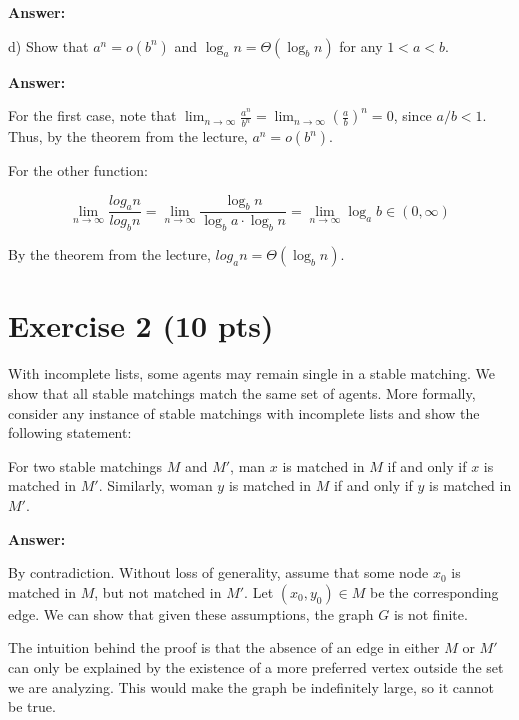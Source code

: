 \documentclass{article}
\begin{document}
\bigskip \noindent \textbf{Answer:}

\noindent d) Show that $a^n = o(b^n)$ and $\log_a n = \Theta (\log_b n)$ for any $1 < a < b$.

\bigskip \noindent \textbf{Answer:}

For the first case, note that $\lim_{n \rightarrow \infty}\frac{a^n}{b^n} = \lim_{n \rightarrow \infty}\left (\frac{a}{b} \right )^n = 0$, since $a/b < 1$. Thus, by the theorem from the lecture, $a^n = o(b^n)$.

For the other function:

$$\lim_{n \rightarrow \infty}\frac{log_a n}{log_b n} = \lim_{n \rightarrow \infty}\frac{\log_b n}{\log_b a \cdot \log_b n} = \lim_{n \rightarrow \infty} \log_a b \in (0,\infty)$$

By the theorem from the lecture, $log_a n = \Theta(\log_b n)$.

\section{Exercise 2 (10 pts)}

With incomplete lists, some agents may remain single in a stable matching. We show that all stable matchings match the same set of agents. More formally, consider any instance of stable matchings with incomplete lists and show the following statement:

For two stable matchings $M$ and $M'$, man $x$ is matched in $M$ if and only if $x$ is matched in $M'$. Similarly, woman $y$ is matched in $M$ if and only if $y$ is matched in $M'$.

\bigskip \noindent \textbf{Answer:}

By contradiction. Without loss of generality, assume that some node $x_0$ is matched in $M$, but not matched in $M'$. Let $(x_0, y_0) \in M$ be the corresponding edge. We can show that given these assumptions, the graph $G$ is not finite.

The intuition behind the proof is that the absence of an edge in either $M$ or $M'$ can only be explained by the existence of a more preferred vertex outside the set we are analyzing. This would make the graph be indefinitely large, so it cannot be true.
\end{document}
